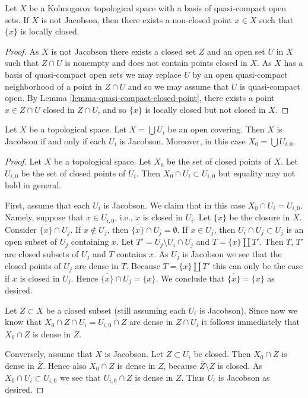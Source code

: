 \begin{lemma}
\label{lemma-non-jacobson-Noetherian-characterize}
Let $X$ be a Kolmogorov topological space with a basis of quasi-compact
open sets.
If $X$ is not Jacobson, then there exists a non-closed point
$x \in X$ such that $\{x\}$ is locally closed.
\end{lemma}

\begin{proof}
As $X$ is not Jacobson there exists a closed set $Z$ and an open set $U$
in $X$ such that $Z \cap U$ is nonempty and does not contain points closed
in $X$. As $X$ has a basis of quasi-compact open sets we may replace $U$
by an open quasi-compact neighborhood of a point in $Z\cap U$ and so we may
assume that $U$ is quasi-compact open. By
Lemma \ref{lemma-quasi-compact-closed-point}, there exists a point
$x \in Z \cap U$ closed in $Z \cap U$,
and so $\{x\}$ is locally closed but not closed in $X$.
\end{proof}

\begin{lemma}
\label{lemma-jacobson-local}
Let $X$ be a topological space.
Let $X = \bigcup U_i$ be an open covering.
Then $X$ is Jacobson if and only if each $U_i$ is Jacobson.
Moreover, in this case $X_0 = \bigcup U_{i, 0}$.
\end{lemma}

\begin{proof}
Let $X$ be a topological space.
Let $X_0$ be the set of closed points of $X$.
Let $U_{i, 0}$ be the set of closed points of
$U_i$. Then $X_0 \cap U_i \subset U_{i, 0}$
but equality may not hold in general.

\medskip\noindent
First, assume that each $U_i$ is Jacobson.
We claim that in this case $X_0 \cap U_i = U_{i, 0}$.
Namely, suppose that $x \in U_{i, 0}$, i.e., $x$ is closed in
$U_i$. Let $\overline{\{x\}}$ be the closure
in $X$. Consider $\overline{\{x\}} \cap U_j$.
If $x \not \in U_j$, then $\overline{\{x\}} \cap U_j = \emptyset$.
If $x \in U_j$, then $U_i \cap U_j \subset U_j$
is an open subset of $U_j$ containing $x$.
Let $T' = U_j \setminus U_i \cap U_j$ and
$T = \{x\} \amalg T'$. Then $T$, $T'$
are closed subsets of $U_j$ and $T$ contains
$x$. As $U_j$ is Jacobson we see that the closed points of
$U_j$ are dense in $T$. Because $T = \{x\} \amalg T'$
this can only be the case if $x$ is closed in $U_j$.
Hence $\overline{\{x\}} \cap U_j = \{x\}$. We conclude
that $\overline{\{x\}} = \{ x \}$ as desired.

\medskip\noindent
Let $Z \subset X$ be a closed subset (still
assuming each $U_i$ is Jacobson).
Since now we know that $X_0 \cap Z  \cap U_i
= U_{i, 0} \cap Z$ are dense in $Z \cap U_i$
it follows immediately that $X_0 \cap Z$ is
dense in $Z$.

\medskip\noindent
Conversely, assume that $X$ is Jacobson.
Let $Z \subset U_i$ be closed. Then
$X_0 \cap \overline{Z}$ is dense in $\overline{Z}$.
Hence also $X_0 \cap Z$ is dense in $Z$, because
$\overline{Z} \setminus Z$ is closed. As $X_0 \cap U_i
\subset U_{i, 0}$ we see that
$U_{i, 0} \cap Z$ is dense in $Z$.
Thus $U_i$ is Jacobson as desired.
\end{proof}

